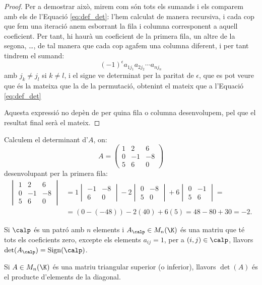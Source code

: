 \begin{proof}
	Per a demostrar això, mirem com són tots els sumands i els comparem amb els de l'Equació \eqref{eq:def_det}: l'hem calculat de manera recursiva, i cada cop que fem una iteració anem esborrant la fila i columna corresponent a aquell coeficient. Per tant, hi haurà un coeficient de la primera fila, un altre de la segona, \ldots, de tal manera que cada cop agafem una columna diferent, i per tant tindrem el sumand:
	\begin{equation}\label{eq:sumanddet}
	(-1)^\epsilon a_{1j_1} a_{2j_2} \cdots a_{nj_n}
	\end{equation}
	amb $j_k\neq j_l$ si $k\neq l$, i el signe ve determinat per la paritat de $\epsilon$, que es pot veure que és la mateixa que la de la permutació, obtenint el mateix que a l'Equació \eqref{eq:def_det}
	
	Aquesta expressió no depèn de per quina fila o columna desenvolupem, pel que el resultat final serà el mateix.
\end{proof}

\begin{exemple}
	Calculem el determinant d'$A$, on:$$
	A=\begin{pmatrix}
	1 & 2 & 6 \\ 0 & -1 & -8 \\ 5 & 6 & 0
	\end{pmatrix}
	$$
	desenvolupant per la primera fila:
	\begin{align*}
	\begin{vmatrix}
	1 & 2 & 6 \\ 0 & -1 & -8 \\ 5 & 6 & 0
	\end{vmatrix} & = 1 \begin{vmatrix} -1 & -8 \\ 6 & 0 \end{vmatrix} 
	-2 \begin{vmatrix} 0 & -8 \\ 5 & 0  \end{vmatrix} +
	6 \begin{vmatrix} 0 & -1 \\ 5 & 6  \end{vmatrix} = \\
	 & = (0-(-48))-2(40)+6(5)=48-80+30=-2.
	\end{align*}
\end{exemple}

\begin{exercici}
Si $\calp$ és un patró amb $n$ elements i $A_\calp\in M_n(\K)$ és una matriu que té tots els coeficients zero, excepte els elements $a_{ij}=1$, per a $(i,j)\in\calp$, llavors $\det(A_\calp)=\sign(\calp)$. 
\end{exercici}
\begin{exercici}
Si $A\in M_n(\K)$ és una matriu triangular superior (o inferior), llavors $\det(A)$ és el producte d'elements de la diagonal.
\end{exercici}

